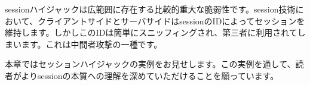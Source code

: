 sessionハイジャックは広範囲に存在する比較的重大な脆弱性です。session技術において、クライアントサイドとサーバサイドはsessionのIDによってセッションを維持します。しかしこのIDは簡単にスニッフィングされ、第三者に利用されてしまいます。これは中間者攻撃の一種です。

本章ではセッションハイジャックの実例をお見せします。この実例を通して、読者がよりsessionの本質への理解を深めていただけることを願っています。
